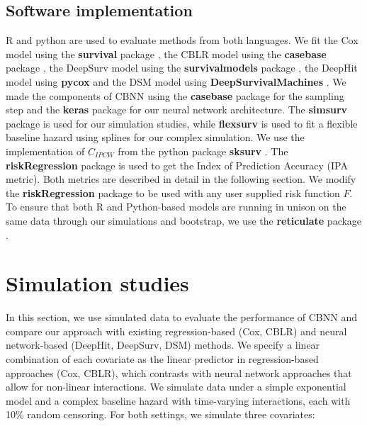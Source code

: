 \documentclass[AMA,STIX1COL,]{WileyNJD-v2}
\begin{document}
\hypertarget{software-implementation}{%
\subsection{Software implementation}\label{software-implementation}}

R \citep{Rsoft} and python \citep{py} are used to evaluate methods from
both languages. We fit the Cox model using the \textbf{survival} package
\citep{survpkg}, the CBLR model using the \textbf{casebase} package
\citep{cbpkg}, the DeepSurv model using the \textbf{survivalmodels}
package \citep{survmods}, the DeepHit model using \textbf{pycox}
\citep{lee2018DeepHit} and the DSM model using
\textbf{DeepSurvivalMachines} \citep{dsmPaper}. We made the components
of CBNN using the \textbf{casebase} package for the sampling step and
the \textbf{keras} \citep{keras} package for our neural network
architecture. The \textbf{simsurv} package \citep{simsurv} is used for
our simulation studies, while \textbf{flexsurv} \citep{flexsurv} is used
to fit a flexible baseline hazard using splines for our complex
simulation. We use the implementation of \(C_{IPCW}\) from the python
package \textbf{sksurv} \citep{sksurv}. The \textbf{riskRegression}
package \citep{riskRegression} is used to get the Index of Prediction
Accuracy (IPA metric). Both metrics are described in detail in the
following section. We modify the \textbf{riskRegression} package to be
used with any user supplied risk function \(F\). To ensure that both R
and Python-based models are running in unison on the same data through
our simulations and bootstrap, we use the \textbf{reticulate} package
\citep{reticulate}.

\hypertarget{sims}{%
\section{Simulation studies}\label{sims}}

In this section, we use simulated data to evaluate the performance of
CBNN and compare our approach with existing regression-based (Cox, CBLR)
and neural network-based (DeepHit, DeepSurv, DSM) methods. We specify a
linear combination of each covariate as the linear predictor in
regression-based approaches (Cox, CBLR), which contrasts with neural
network approaches that allow for non-linear interactions. We simulate
data under a simple exponential model and a complex baseline hazard with
time-varying interactions, each with 10\% random censoring. For both
settings, we simulate three covariates:
\end{document}
